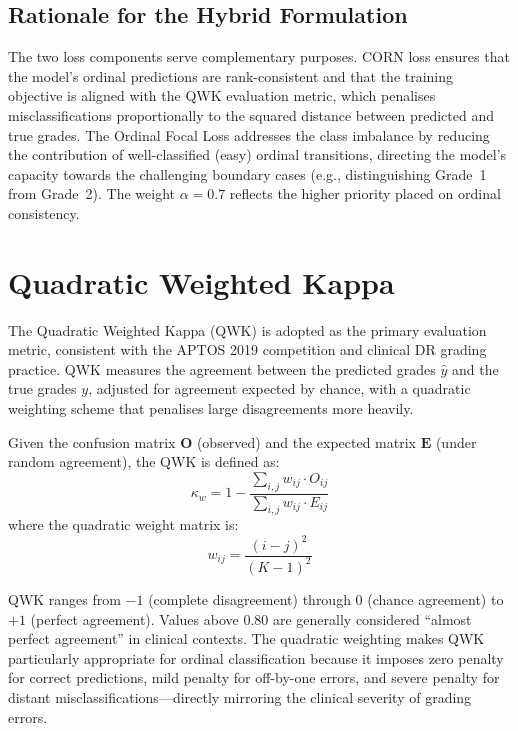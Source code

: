 \subsection{Rationale for the Hybrid Formulation}

The two loss components serve complementary purposes. CORN loss ensures that the model's ordinal predictions are rank-consistent and that the training objective is aligned with the QWK evaluation metric, which penalises misclassifications proportionally to the squared distance between predicted and true grades. The Ordinal Focal Loss addresses the class imbalance by reducing the contribution of well-classified (easy) ordinal transitions, directing the model's capacity towards the challenging boundary cases (e.g., distinguishing Grade~1 from Grade~2). The weight $\alpha = 0.7$ reflects the higher priority placed on ordinal consistency.

\section{Quadratic Weighted Kappa}
\label{sec:qwk}

The Quadratic Weighted Kappa (QWK) \cite{cohen1968weighted} is adopted as the primary evaluation metric, consistent with the APTOS 2019 competition and clinical DR grading practice. QWK measures the agreement between the predicted grades $\hat{y}$ and the true grades $y$, adjusted for agreement expected by chance, with a quadratic weighting scheme that penalises large disagreements more heavily.

Given the confusion matrix $\mathbf{O}$ (observed) and the expected matrix $\mathbf{E}$ (under random agreement), the QWK is defined as:
\begin{equation}
    \kappa_w = 1 - \frac{\sum_{i,j} w_{ij} \cdot O_{ij}}{\sum_{i,j} w_{ij} \cdot E_{ij}}
    \label{eq:qwk}
\end{equation}
where the quadratic weight matrix is:
\begin{equation}
    w_{ij} = \frac{(i - j)^2}{(K - 1)^2}
    \label{eq:qwk_weights}
\end{equation}

QWK ranges from $-1$ (complete disagreement) through $0$ (chance agreement) to $+1$ (perfect agreement). Values above 0.80 are generally considered ``almost perfect agreement'' in clinical contexts. The quadratic weighting makes QWK particularly appropriate for ordinal classification because it imposes zero penalty for correct predictions, mild penalty for off-by-one errors, and severe penalty for distant misclassifications---directly mirroring the clinical severity of grading errors.

